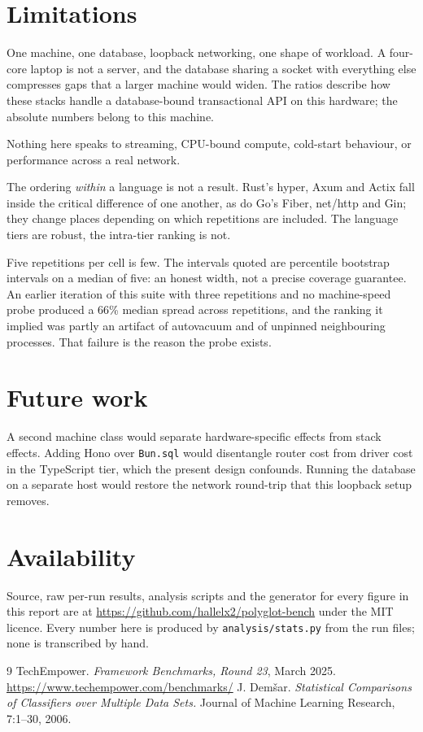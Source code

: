 \documentclass[11pt,a4paper]{article}
\begin{document}
\section{Limitations}

One machine, one database, loopback networking, one shape of workload. A
four-core laptop is not a server, and the database sharing a socket with
everything else compresses gaps that a larger machine would widen. The ratios
describe how these stacks handle a database-bound transactional API on this
hardware; the absolute numbers belong to this machine.

Nothing here speaks to streaming, CPU-bound compute, cold-start behaviour, or
performance across a real network.

The ordering \emph{within} a language is not a result. Rust's hyper, Axum and
Actix fall inside the critical difference of one another, as do Go's Fiber,
net/http and Gin; they change places depending on which repetitions are
included. The language tiers are robust, the intra-tier ranking is not.

Five repetitions per cell is few. The intervals quoted are percentile bootstrap
intervals on a median of five: an honest width, not a precise coverage
guarantee. An earlier iteration of this suite with three repetitions and no
machine-speed probe produced a 66\% median spread across repetitions, and the
ranking it implied was partly an artifact of autovacuum and of unpinned
neighbouring processes. That failure is the reason the probe exists.

\section{Future work}

A second machine class would separate hardware-specific effects from stack
effects. Adding Hono over \texttt{Bun.sql} would disentangle router cost from
driver cost in the TypeScript tier, which the present design confounds. Running
the database on a separate host would restore the network round-trip that this
loopback setup removes.

\section{Availability}

Source, raw per-run results, analysis scripts and the generator for every figure
in this report are at \url{https://github.com/hallelx2/polyglot-bench} under the
MIT licence. Every number here is produced by \texttt{analysis/stats.py} from
the run files; none is transcribed by hand.

\begin{thebibliography}{9}
 TechEmpower.
\emph{Framework Benchmarks, Round 23}, March 2025.
\url{https://www.techempower.com/benchmarks/}
 J. Dem\v{s}ar.
\emph{Statistical Comparisons of Classifiers over Multiple Data Sets.}
Journal of Machine Learning Research, 7:1--30, 2006.
\end{thebibliography}
\end{document}
